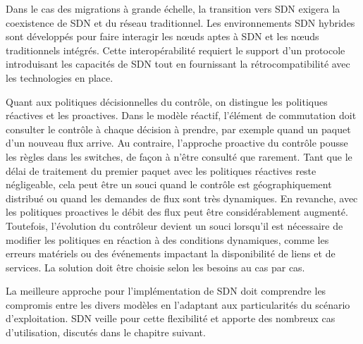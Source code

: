 Dans le cas des migrations à grande échelle, la transition vers SDN exigera la coexistence de SDN et du réseau traditionnel. Les environnements SDN hybrides sont développés pour faire interagir les nœuds aptes à SDN et les nœuds traditionnels intégrés. Cette interopérabilité requiert le support d'un protocole introduisant les capacités de  SDN tout en fournissant la rétrocompatibilité avec les technologies en place. \cite{AdoptionResearchTrendsImplementationIssues}




Quant aux politiques décisionnelles du contrôle, on distingue les politiques réactives et les proactives. Dans le modèle réactif, l'élément de commutation doit consulter le contrôle à chaque décision à prendre, par exemple quand un paquet d'un nouveau flux arrive. Au contraire, l'approche proactive du contrôle pousse les règles dans les switches, de façon à n'être consulté que rarement. Tant que le délai de traitement du premier paquet avec les politiques réactives reste négligeable, cela peut être un souci quand le contrôle est géographiquement distribué ou quand les demandes de flux sont très dynamiques. En revanche, avec les politiques proactives le débit des flux peut être considérablement augmenté. Toutefois, l'évolution du contrôleur devient un souci lorsqu'il est nécessaire de modifier les politiques en réaction à des conditions dynamiques, comme les erreurs matériels ou des événements impactant la disponibilité de liens et de services. La solution doit être choisie selon les besoins au cas par cas. \cite{SurveySDNArchi} \cite{CiscoSDNWhyLike} 

La meilleure approche pour l'implémentation de SDN doit comprendre les compromis entre les divers modèles en l'adaptant aux particularités du scénario d'exploitation. SDN veille pour cette flexibilité et apporte des nombreux cas d'utilisation, discutés dans le chapitre suivant.

